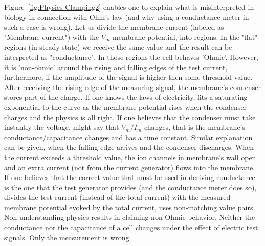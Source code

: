 Figure~\ref{fig:Physics-Clamping2} enables one to explain what is misinterpreted in biology in connection with Ohm's law (and why using a conductance meter in such a case is wrong).
Let us divide the membrane current  (labeled as "Membrane current") with the $V_m$ membrane potential, into regions.
In the "flat" regions (in steady state) we receive the same value and the result can be interpreted as "conductance". In those regions 
the cell behaves 'Ohmic'. However, it is 'non-ohmic' around the
rising and falling edges of the test current, furthermore,
if the amplitude of the signal is higher then some threshold value.
After receiving the rising edge of the measuring signal, the membrane's condenser stores part of the charge.
If one knows the laws of electricity, fits a saturating exponential to the curve as the membrane potential rises when the condenser charges and the physics is all right.
If one believes that the condenser must take instantly the voltage, might say that $V_m/I_m$ changes, that is the membrane's conductance/capacitance changes and has a time constant.
Similar explanation can be given, when the falling edge arrives and the condenser discharges.
%
When the current exceeds a threshold value, the ion channels in membrane's wall open and an extra current (not from the current generator) flows into the membrane.
If one believes that the correct value that must be used in deriving conductance is the one that the test generator provides (and the conductance meter does so), divides the test current (instead of the total current) with the measured membrane potential evoked by the total current, uses non-matching value pairs. 
Non-understanding physics results in claiming non-Ohmic behavior.
Neither the conductance nor the capacitance of a cell changes
under the effect of electric test signals. Only the measurement is wrong. 

%


	
